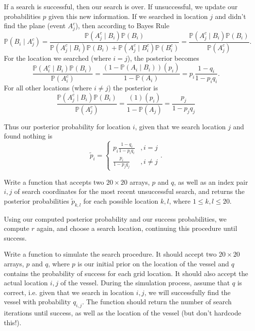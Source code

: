 If a search is successful, then our search is over. If unsuccessful, we update our probabilities $p$ given this new information. If we searched in location $j$ and didn't find the plane (event  $A_j^c$), then according to Bayes Rule 
\begin{equation*}
\mathbb{P}(B_{i} \; | \; A_j^c) 
= \frac{\mathbb{P}(A_j^c \; | \; B_{i})\mathbb{P}(B_{i})}{\mathbb{P}(A_j^c \; | \; B_{i})\mathbb{P}(B_{i}) + \mathbb{P}(A_j^c \; | \; B_{i}^{c})\mathbb{P}(B_{i}^{c})} 
= \frac{\mathbb{P}(A_j^c \; | \; B_{i})\mathbb{P}(B_{i})}{\mathbb{P}(A_j^c)}.
\end{equation*}
For the location we searched (where $i=j$), the posterior becomes 
\begin{equation*}
\frac{\mathbb{P}(A_i^c \; | \; B_{i})\mathbb{P}(B_{i})}{\mathbb{P}(A_i^c)} 
= \frac{(1-\mathbb{P}(A_i \; | \; B_{i}))(p_i)}{1-\mathbb{P}(A_i)}  = p_{i}\frac{1-q_{i}}{1-p_{i}q_{i}}. 
\end{equation*}
 For all other locations (where $i \neq j$) the posterior is $$\frac{\mathbb{P}(A_j^c \; | \; B_{i})\mathbb{P}(B_{i})}{\mathbb{P}(A_j^c)} =\frac{(1)(p_i)}{1-\mathbb{P}(A_j)} = \frac{p_j}{1-p_j q_j}$$


Thus our posterior probability for location $i$, given that we search location $j$ and found nothing is
$$\tilde{p}_{i} = \begin{cases} 
 p_{i}\frac{1-q_{i}}{1-p_{i}q_{i}} & ,  i=j \\
\frac{p_{i}}{1-p_{j}q_{j}} & , i \neq j 
\end{cases}.$$

\begin{problem}
Write a function that accepts two $20 \times 20$ arrays, $p$ and $q$, as well as an index pair $i,j$ of search coordinates for the most recent unsuccessful search, and returns the posterior probabilities $\tilde{p}_{k,l}$ for each possible location $k,l$, where $1 \leq k,l \leq 20$.
\end{problem}

Using our computed posterior probability and our success probabilities, we compute $r$ again, and choose a search location, continuing this procedure until success.

\begin{problem}
Write a function to simulate the search procedure. It should accept two $20 \times 20$ arrays, $p$ and $q$, where $p$ is our initial prior on the location of the vessel and $q$ contains the probability of success for each grid location. It should also accept the actual location $i,j$ of the vessel. During the simulation process, assume that $q$ is correct, i.e. given that we search in location $i,j$, we will successfully find the vessel with probability $q_{i,j}$. The function should return the number of search iterations until success, as well as the location of the vessel (but don't hardcode this!).
\end{problem}

